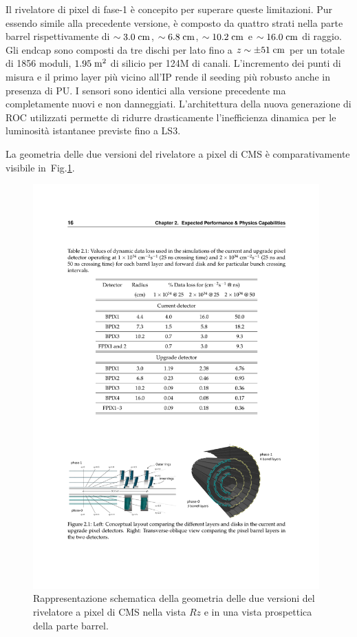 \begin{description}
Il rivelatore di pixel di fase-1 \`e concepito per superare queste limitazioni. Pur essendo simile alla precedente versione, \`e composto da quattro strati nella parte barrel rispettivamente di $\sim 3.0\rm \; cm$, $\sim 6.8\rm \; cm$, $\sim 10.2\rm \; cm$ e $\sim 16.0\rm \; cm$ di raggio. Gli endcap sono composti da tre dischi per lato fino a $z\sim\pm 51\rm \; cm$ per un totale di 1856 moduli, $1.95\rm \; m^2$ di silicio per 124M di canali. L'incremento dei punti di misura e il primo layer pi\`u vicino all'IP rende il seeding pi\`u robusto anche in presenza di PU. I sensori sono identici alla versione precedente ma completamente nuovi e non danneggiati. L'architettura della nuova generazione di ROC utilizzati permette di ridurre drasticamente l'inefficienza dinamica per le luminosit\`a istantanee previste fino a LS3. 

La geometria delle due versioni del rivelatore a pixel di CMS \`e comparativamente visibile in~Fig.\ref{fig:PXLph0ph1}.
\begin{figure}
\centering
\includegraphics[width=0.98\textwidth]{Immagini/PXLph0ph1.pdf}
\caption{Rappresentazione schematica della geometria delle due versioni del rivelatore a pixel di CMS nella vista $Rz$ e in una vista prospettica della parte barrel.}
\label{fig:PXLph0ph1}
\end{figure}


\end{description}
